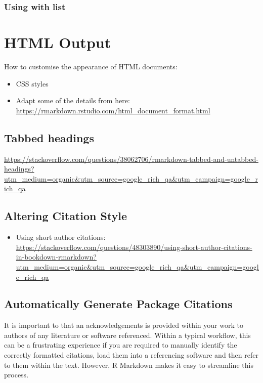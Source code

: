 \documentclass[]{book}
\providecommand{\tightlist}{%
  \setlength{\itemsep}{0pt}\setlength{\parskip}{0pt}}
\begin{document}
\subsection{Using with list}\label{using-with-list}

\chapter{HTML Output}\label{html-output}

How to customise the appearance of HTML documents:

\begin{itemize}
\tightlist
\item
  CSS styles
\item
  Adapt some of the details from here:
  \url{https://rmarkdown.rstudio.com/html_document_format.html}
\end{itemize}

\section{Tabbed headings}\label{tabbed-headings}

\url{https://stackoverflow.com/questions/38062706/rmarkdown-tabbed-and-untabbed-headings?utm_medium=organic\&utm_source=google_rich_qa\&utm_campaign=google_rich_qa}

\section{Altering Citation Style}\label{altering-citation-style}

\begin{itemize}
\tightlist
\item
  Using short author citations:
  \url{https://stackoverflow.com/questions/48303890/using-short-author-citations-in-bookdown-rmarkdown?utm_medium=organic\&utm_source=google_rich_qa\&utm_campaign=google_rich_qa}
\end{itemize}

\section{Automatically Generate Package
Citations}\label{automatically-generate-package-citations}

It is important to that an acknowledgements is provided within your work
to authors of any literature or software referenced. Within a typical
workflow, this can be a frustrating experience if you are required to
manually identify the correctly formatted citations, load them into a
referencing software and then refer to them within the text. However, R
Markdown makes it easy to streamline this process.
\end{document}
